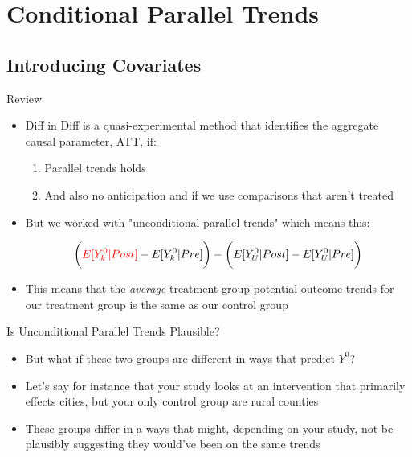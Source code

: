 \documentclass{beamer}
\begin{document}





\section{Conditional Parallel Trends}

\subsection{Introducing Covariates}

\begin{frame}{Review}

\begin{itemize}
\item Diff in Diff is a quasi-experimental method that identifies the aggregate causal parameter, ATT, if:

	\begin{enumerate}
	\item Parallel trends holds
	\item And also no anticipation and if we use comparisons that aren't treated
	\end{enumerate}
	
\item But we worked with "unconditional parallel trends" which means this:

	$$ \bigg ( \textcolor{red}{E[Y^0_k|Post]} - E[Y^0_k|Pre] \bigg ) - \bigg ( E[Y^0_U|Post] - E[Y^0_U | Pre] \bigg )$$
	
\item This means that the \emph{average} treatment group potential outcome trends for our treatment group is the same as our control group

\end{itemize}

\end{frame}

\begin{frame}{Is Unconditional Parallel Trends Plausible?}

\begin{itemize}

\item But what if these two groups are different in ways that predict $Y^0$?

\item Let's say for instance that your study looks at an intervention that primarily effects cities, but your only control group are rural counties

\item These groups differ in a ways that might, depending on your study, not be plausibly suggesting they would've been on the same trends

\end{itemize}

\end{frame}
\end{document}
